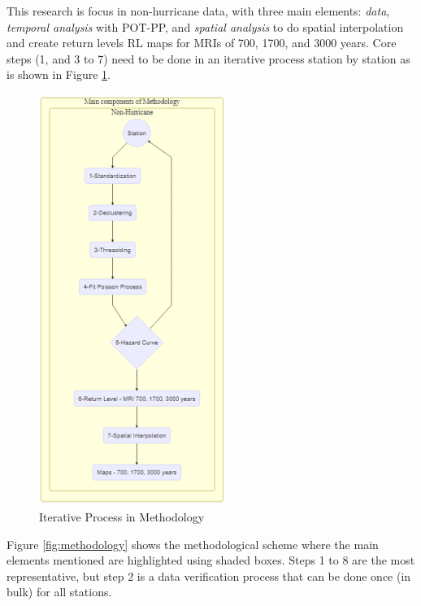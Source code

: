 \documentclass[12pt,twoside]{reedthesis}
\begin{document}
This research is focus in non-hurricane data, with three main elements: \emph{data}, \emph{temporal analysis} with POT-PP, and \emph{spatial analysis} to do spatial interpolation and create return levels RL maps for MRIs of 700, 1700, and 3000 years. Core steps (1, and 3 to 7) need to be done in an iterative process station by station as is shown in Figure \ref{fig:mainmethodology}.
\begin{figure}

{\centering \includegraphics[width=2.4in]{figure/main_methodology} 

}

\caption{Iterative Process in Methodology}\label{fig:mainmethodology}
\end{figure}
Figure \ref{fig:methodology} shows the methodological scheme where the main elements mentioned are highlighted using shaded boxes. Steps 1 to 8 are the most representative, but step 2 is a data verification process that can be done once (in bulk) for all stations.
\end{document}
